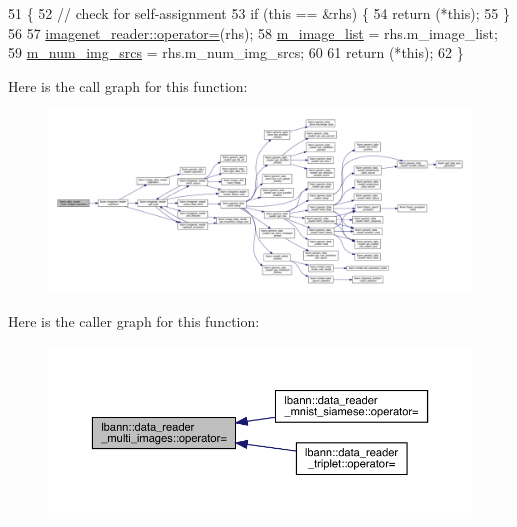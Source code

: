 \begin{DoxyCode}
51                                                                                                  \{
52   \textcolor{comment}{// check for self-assignment}
53   \textcolor{keywordflow}{if} (\textcolor{keyword}{this} == &rhs) \{
54     \textcolor{keywordflow}{return} (*\textcolor{keyword}{this});
55   \}
56 
57   \hyperlink{classlbann_1_1imagenet__reader_a5ea15cc16aa679a2cb549b44eb77f323}{imagenet\_reader::operator=}(rhs);
58   \hyperlink{classlbann_1_1data__reader__multi__images_a6d8e2d161c9efff1ac70f847b4a7e9d0}{m\_image\_list} = rhs.m\_image\_list;
59   \hyperlink{classlbann_1_1data__reader__multi__images_a70752a5442e99333fec52def9eadc58f}{m\_num\_img\_srcs} = rhs.m\_num\_img\_srcs;
60 
61   \textcolor{keywordflow}{return} (*\textcolor{keyword}{this});
62 \}
\end{DoxyCode}
Here is the call graph for this function\+:\nopagebreak
\begin{figure}[H]
\begin{center}
\leavevmode
\includegraphics[width=350pt]{classlbann_1_1data__reader__multi__images_a8d9eae4dde10654c1f1bf7c1fe685e99_cgraph}
\end{center}
\end{figure}
Here is the caller graph for this function\+:\nopagebreak
\begin{figure}[H]
\begin{center}
\leavevmode
\includegraphics[width=350pt]{classlbann_1_1data__reader__multi__images_a8d9eae4dde10654c1f1bf7c1fe685e99_icgraph}
\end{center}
\end{figure}
\mbox{\label{classlbann_1_1data__reader__multi__images_a3160c8ee0e30304a1f5fc07d08e6cb40}} 
